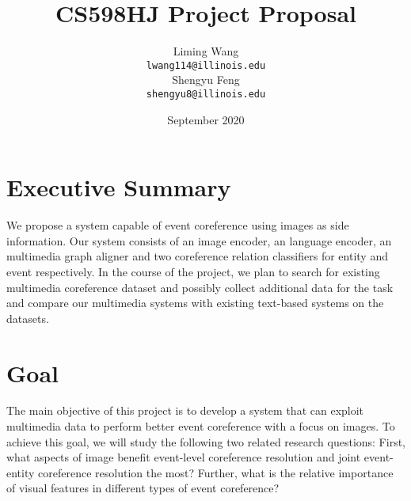 \documentclass[11pt,a4paper]{article}
\title{CS598HJ Project Proposal}
\author{Liming Wang\\
\texttt{lwang114@illinois.edu}\\\And
Shengyu Feng\\
\texttt{shengyu8@illinois.edu}\\
}
\date{September 2020}
\newcommand{\bx}{\mathbf{x}}
\newcommand{\cD}{\mathcal{D}}
\begin{document}
\maketitle

\section{Executive Summary}
We propose a system capable of event coreference using images as side information. Our system consists of an image encoder, an language encoder, an multimedia graph aligner and two coreference relation classifiers for entity and event respectively. In the course of the project, we plan to search for existing multimedia coreference dataset and possibly collect additional data for the task and compare our multimedia systems with existing text-based systems on the datasets.  

\section{Goal}
The main objective of this project is to develop a system that can exploit multimedia data to perform better event coreference with a focus on images. To achieve this goal, we will study the following two related research questions: First, what aspects of image benefit event-level coreference resolution and joint event-entity coreference resolution the most? Further, what is the relative importance of visual features in different types of event coreference? 
\end{document}
